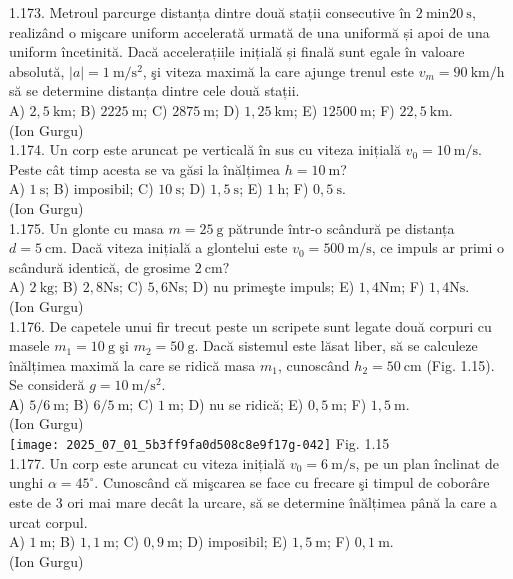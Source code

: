 1.173. Metroul parcurge distanța dintre două stații consecutive în $2 \mathrm{~min} 20 \mathrm{~s}$, realizând o mişcare uniform accelerată urmată de una uniformă și apoi de una uniform încetinită. Dacă accelerațiile inițială și finală sunt egale în valoare absolută, $|a|=1 \mathrm{~m} / \mathrm{s}^{2}$, şi viteza maximă la care ajunge trenul este $v_{m}=90 \mathrm{~km} / \mathrm{h}$ să se determine distanța dintre cele două stații.\\ A) $2,5 \mathrm{~km}$; B) $2225 \mathrm{~m}$; C) $2875 \mathrm{~m}$; D) $1,25 \mathrm{~km}$; E) $12500 \mathrm{~m}$; F) $22,5 \mathrm{~km}$.\\ (Ion Gurgu)\\

1.174. Un corp este aruncat pe verticală în sus cu viteza inițială $v_{0}=10 \mathrm{~m} / \mathrm{s}$. Peste cât timp acesta se va găsi la înălțimea $h=10 \mathrm{~m}$?\\ A) $1 \mathrm{~s}$; B) imposibil; C) $10 \mathrm{~s}$; D) $1,5 \mathrm{~s}$; E) $1 \mathrm{~h}$; F) $0,5 \mathrm{~s}$.\\ (Ion Gurgu)\\

1.175. Un glonte cu masa $m=25 \mathrm{~g}$ pătrunde într-o scândură pe distanța $d=5 \mathrm{~cm}$. Dacă viteza inițială a glontelui este $v_{0}=500 \mathrm{~m} / \mathrm{s}$, ce impuls ar primi o scândură identică, de grosime $2 \mathrm{~cm}?$\\ A) $2 \mathrm{~kg}$; B) $2,8 \mathrm{Ns}$; C) $5,6 \mathrm{Ns}$; D) nu primeşte impuls; E) $1,4 \mathrm{Nm}$; F) $1,4 \mathrm{Ns}$.\\ (Ion Gurgu)\\

1.176. De capetele unui fir trecut peste un scripete sunt legate două corpuri cu masele $m_{1}=10 \mathrm{~g}$ şi $m_{2}=50 \mathrm{~g}$. Dacă sistemul este lăsat liber, să se calculeze înălțimea maximă la care se ridică masa $m_{1}$, cunoscând $h_{2}=50 \mathrm{~cm}$ (Fig. 1.15). Se consideră $g=10 \mathrm{~m} / \mathrm{s}^{2}$.\\ А) $5 / 6 \mathrm{~m}$; B) $6 / 5 \mathrm{~m}$; C) $1 \mathrm{~m}$; D) nu se ridică; E) $0,5 \mathrm{~m}$; F) $1,5 \mathrm{~m}$.\\ (Ion Gurgu)\\ \texttt{[image: 2025\_07\_01\_5b3ff9fa0d508c8e9f17g-042]} Fig. 1.15\\

1.177. Un corp este aruncat cu viteza inițială $v_{0}=6 \mathrm{~m} / \mathrm{s}$, pe un plan înclinat de unghi $\alpha=45^{\circ}$. Cunoscând că mişcarea se face cu frecare şi timpul de coborâre este de 3 ori mai mare decât la urcare, să se determine înălțimea până la care a urcat corpul.\\ A) $1 \mathrm{~m}$; B) $1,1 \mathrm{~m}$; C) $0,9 \mathrm{~m}$; D) imposibil; E) $1,5 \mathrm{~m}$; F) $0,1 \mathrm{~m}$.\\ (Ion Gurgu)\\

